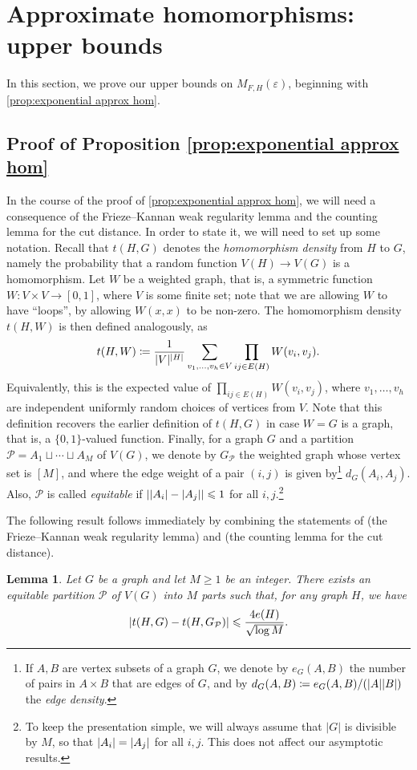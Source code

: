 \documentclass[reqno, english, 12pt]{amsart}
\theoremstyle{plain}
\newtheorem{lemma}[theorem]{Lemma}
\theoremstyle{remark}
\DeclarePairedDelimiter{\abs}{\lvert}{\rvert}
\renewcommand{\leq}{\leqslant}
\renewcommand{\geq}{\geqslant}
\newcommand\p{\mathcal{P}}
\begin{document}
\section{Approximate homomorphisms: upper bounds}\label{sec:approx hom upper}
In this section, we prove our upper bounds on $M_{F,H}(\varepsilon)$, beginning with \cref{prop:exponential approx hom}.
\subsection{Proof of Proposition \ref{prop:exponential approx hom}}


In the course of the proof of \cref{prop:exponential approx hom}, we will need a consequence of the Frieze--Kannan weak regularity lemma \cite{MR1723039} and the counting lemma for the cut distance. In order to state it, we will need to set up some notation. Recall that $t(H,G)$ denotes the \emph{homomorphism density} from $H$ to $G$, namely the probability that a random function $V(H) \to V(G)$ is a homomorphism. Let $W$ be a weighted graph, that is, a symmetric function $W:V \times V \to [0,1]$, where $V$ is some finite set; note that we are allowing $W$ to have ``loops'', by allowing $W(x,x)$ to be non-zero. The homomorphism density $t(H,W)$ is then defined analogously, as 
\[
t(H,W)\coloneqq \frac{1}{\abs V^{\abs H}} \sum_{v_1,\dots,v_h \in V} \prod_{ij \in E(H)} W(v_i, v_j).
\]
Equivalently, this is the expected value of $\prod_{ij \in E(H)} W(v_i,v_j)$, where $v_1,\dots,v_h$ are independent uniformly random choices of vertices from $V$. Note that this definition recovers the earlier definition of $t(H,G)$ in case $W=G$ is a graph, that is, a $\{0,1\}$-valued function. Finally, for a graph $G$ and a partition $\p = A_1 \sqcup \dotsb \sqcup A_M$ of $V(G)$, we denote by $G_\p$ the weighted graph whose vertex set is $[M]$, and where the edge weight of a pair $(i,j)$ is given by\footnote{If $A,B$ are vertex subsets of a graph $G$, we denote by $e_G(A,B)$ the number of pairs in $A \times B$ that are edges of $G$, and by $d_G(A,B) \coloneqq e_G(A,B)/(\abs A \abs B)$ the \emph{edge density}.} $d_G(A_i, A_j)$. Also, $\p$ is called \emph{equitable} if $\abs{\abs{A_i}-\abs{A_j}}\leq 1$ for all $i,j$.\footnote{To keep the presentation simple, we will always assume that $|G|$ is divisible by $M$, so that $\abs{A_i} = \abs{A_j}$ for all $i,j$. This does not affect our asymptotic results.}

The following result follows immediately by combining the statements of \cite[Lemma 9.3 and Exercise 9.7]{lovasz_book} (the Frieze--Kannan weak regularity lemma) and \cite[Lemma 10.23]{lovasz_book} (the counting lemma for the cut distance).
\begin{lemma}\label{lem:FK}
	Let $G$ be a graph and let $M\geq 1$ be an integer. There exists an equitable partition $\p$ of $V(G)$ into $M$ parts such that, for any graph $H$, we have
	\[
	\abs{t(H,G) - t(H,G_\p)} \leq \frac{4e(H)}{\sqrt{\log M}}.
	\]
\end{lemma}
\end{document}
